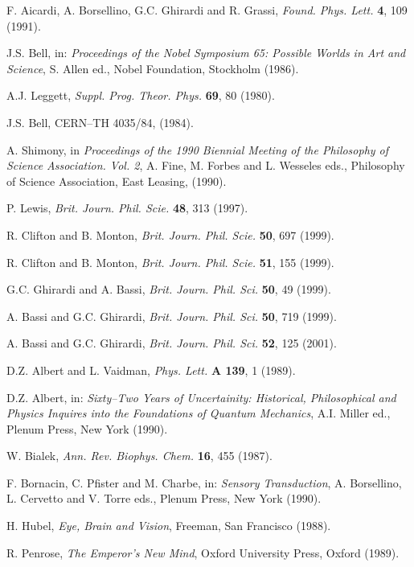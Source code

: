 \documentclass[10pt,a4paper]{article}
\begin{document}
\begin{thebibliography}{999}
 F. Aicardi, A. Borsellino, G.C. Ghirardi and R.
Grassi, {\it Found. Phys. Lett.} {\bf 4}, 109 (1991).

 J.S. Bell, in: {\it Proceedings of the Nobel
Symposium 65: Possible Worlds in Art and Science}, S. Allen ed.,
Nobel Foundation, Stockholm (1986).

 A.J. Leggett, {\it Suppl. Prog. Theor. Phys.}
{\bf 69}, 80 (1980).

 J.S. Bell, CERN--TH 4035/84, (1984).

 A. Shimony, in {\it Proceedings of the 1990
Biennial Meeting of the Philosophy of Science Association. Vol.
2}, A. Fine, M. Forbes and L. Wesseles eds., Philosophy of Science
Association, East Leasing, (1990).

 P. Lewis, {\it Brit. Journ. Phil. Scie.} {\bf 48},
313 (1997).

 R. Clifton and B. Monton, {\it Brit. Journ. Phil.
Scie.} {\bf 50}, 697 (1999).

 R. Clifton and B. Monton, {\it Brit. Journ. Phil.
Scie.} {\bf 51}, 155 (1999).

 G.C. Ghirardi and A. Bassi, {\it Brit. Journ.
Phil. Sci.} {\bf 50}, 49 (1999).

 A. Bassi and G.C. Ghirardi, {\it Brit. Journ.
Phil. Sci.} {\bf 50}, 719 (1999).

 A. Bassi and G.C. Ghirardi, {\it Brit. Journ.
Phil. Sci.} {\bf 52}, 125 (2001).

 D.Z. Albert and L. Vaidman, {\it Phys. Lett.} {\bf A
139}, 1 (1989).

 D.Z. Albert, in: {\it Sixty--Two Years of
Uncertainity: Historical, Philosophical and Physics Inquires into
the Foundations of Quantum Mechanics}, A.I. Miller ed., Plenum
Press, New York (1990).

 W. Bialek, {\it Ann. Rev. Biophys. Chem.} {\bf 16},
455 (1987).

 F. Bornacin, C. Pfister and M. Charbe, in: {\it
Sensory Transduction}, A. Borsellino, L. Cervetto and V. Torre
eds., Plenum Press, New York (1990).

 H. Hubel, {\it Eye, Brain and Vision}, Freeman, San
Francisco (1988).

 R. Penrose, {\it The Emperor's New Mind}, Oxford
University Press, Oxford (1989).


\end{thebibliography}
\end{document}
